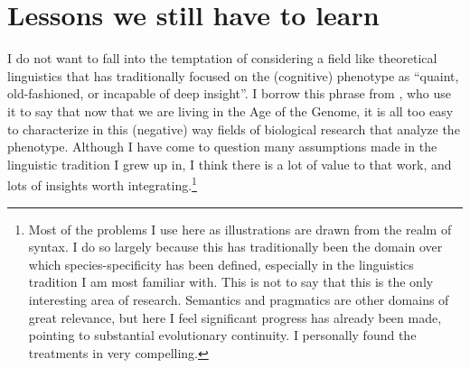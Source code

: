 \chapter{Lessons we still have to learn}\label{chap3}

I do not want to fall into the temptation of considering a field like theoretical linguistics that has traditionally focused on the (cognitive) phenotype as ``quaint, old-fashioned, or incapable of deep insight''. I borrow this phrase from \cite{jarrett2018and}, who use it to say that now that we are living in the Age of the Genome, it is all too easy to characterize in this (negative) way fields of biological research that analyze the phenotype. Although I have come to question many assumptions made in the linguistic tradition I grew up in, I think there is a lot of value to that work, and lots of insights worth integrating.\footnote{Most of the problems I use here as illustrations are drawn from the realm of syntax. I do so largely because this has traditionally been the domain over which species-specificity has been defined, especially in the linguistics tradition I am most familiar with. This is not to say that this is the only interesting area of research. Semantics and pragmatics are other domains of great relevance, but here I feel significant progress has already been made, pointing to substantial evolutionary continuity. I personally found the treatments in \cite{hurford2007origins,moore2018gricean2,moore2018gricean,krupenye2019theory} very compelling.}

